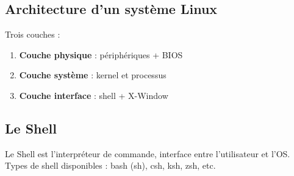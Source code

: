 \documentclass[12pt,a4paper]{article}
\begin{document}

\subsection{Architecture d'un syst\`eme Linux}
Trois couches :
\begin{enumerate}
    \item \textbf{Couche physique} : p\'eriph\'eriques + BIOS %
    \item \textbf{Couche syst\`eme} : kernel et processus %
    \item \textbf{Couche interface} : shell + X-Window %
\end{enumerate}


\subsection{Le Shell}
Le Shell est l'interpr\'eteur de commande, interface entre l'utilisateur et l'OS. Types de shell disponibles : bash (sh), csh, ksh, zsh, etc.

\end{document}
